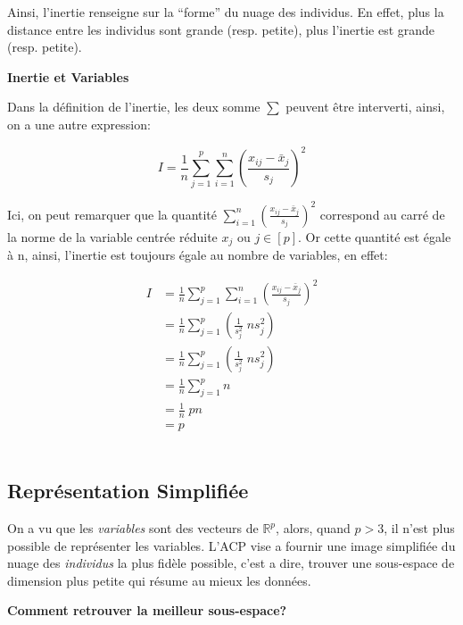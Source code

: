\documentclass{article}
\begin{document}
Ainsi, l’inertie renseigne sur la ``forme'' du nuage des individus. En effet, plus la distance entre les individus sont grande (resp. petite), plus l'inertie est grande (resp. petite).

\begin{flushleft}
\textbf{Inertie et Variables}
\end{flushleft}

Dans la définition de l'inertie, les deux somme $\sum$ peuvent être interverti, ainsi, on a une autre expression:

\begin{equation*}
I = \frac{1}{n} \sum_{j=1}^p \sum_{i=1}^n {\left( \frac{x_{ij}-\bar{x}_j}{s_j} \right)}^2
\end{equation*}

Ici, on peut remarquer que la quantité $\sum_{i=1}^n {\left( \frac{x_{ij}-\bar{x}_j}{s_j} \right)}^2$ correspond au carré de la norme de la variable centrée réduite $x_j$ ou $j \in [p]$. Or cette quantité est égale à n, ainsi, l'inertie est toujours égale au nombre de variables, en effet:

\begin{align*}
I &= \frac{1}{n} \sum_{j=1}^p \sum_{i=1}^n {\left( \frac{x_{ij}-\bar{x}_j}{s_j} \right)}^2 \\
  &= \frac{1}{n} \sum_{j=1}^p \left( \frac{1}{s_j^2} \; n{s_j^2} \right) \\  
  &= \frac{1}{n} \sum_{j=1}^p \left( \frac{1}{s_j^2} \; n{s_j^2} \right) \\
  &= \frac{1}{n} \sum_{j=1}^p n \\
  &= \frac{1}{n} \; pn \\
  &= p
\end{align*}
\\

\subsection{Représentation Simplifiée}

On a vu que les \textit{variables} sont des vecteurs de $\mathbb{R}^p$, alors, quand $p > 3$, il n'est plus possible de représenter les variables. L'ACP vise a fournir une image simplifiée du nuage des \textit{individus} la plus fidèle possible, c'est a dire, trouver une sous-espace de dimension plus petite qui résume au mieux les données.
\newline

\newpage

\begin{flushleft}
\textbf{Comment retrouver la meilleur sous-espace?}
\end{flushleft}
\end{document}
